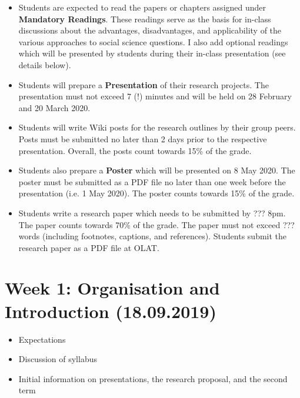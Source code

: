 \documentclass[abstract=on,parskip=full,headings=standardclasses,fontsize=11pt,paper=a4]{scrartcl}
\begin{document}
\begin{itemize}
\item Students are expected to read the papers or chapters assigned under \textbf{Mandatory Readings}. These readings serve as the basis for in-class discussions about the advantages, disadvantages, and applicability of the various approaches to social science questions. I also add optional readings which will be presented by students during their in-class presentation (see details below). 

\item Students will prepare a  \textbf{Presentation} of their research projects. The presentation must not exceed 7 (!) minutes and will be held on 28 February and 20 March 2020. 

\item Students will write Wiki posts for the research outlines by their group peers. Posts must be submitted no later than 2 days prior to the respective presentation. Overall, the posts count towards 15\% of the grade.

\item Students also prepare a \textbf{Poster} which will be presented on 8 May 2020. The poster must be submitted as a PDF file no later than one week before the presentation (i.e. 1 May 2020). The poster counts towards 15\% of the grade. 

\item Students write a research paper which needs to be submitted by ??? 8pm. The paper counts towards 70\% of the grade. The paper must not exceed ??? words (including footnotes, captions, and references). Students submit the research paper as a PDF file at OLAT.


\end{itemize}



\newpage

\tableofcontents

\section{Week 1: Organisation and Introduction (18.09.2019)}

\begin{itemize}
\renewcommand\labelitemi{--}
\item Expectations
\item Discussion of syllabus
\item Initial information on presentations, the research proposal, and the second term 
\end{itemize}
\end{document}
